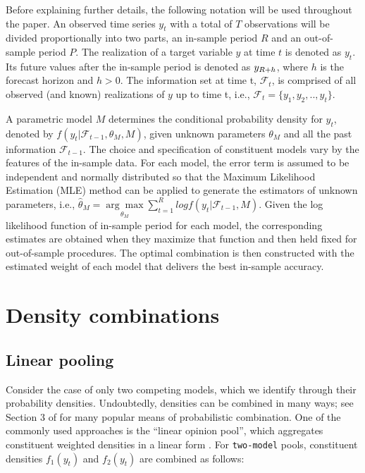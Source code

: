 \documentclass{monashthesis}
\begin{document}
Before explaining further details, the following notation will be used throughout the paper. An observed time series \(y_t\) with a total of \(T\) observations will be divided proportionally into two parts, an in-sample period \(R\) and an out-of-sample period \(P\). The realization of a target variable \(y\) at time \(t\) is denoted as \(y_t\). Its future values after the in-sample period is denoted as \(y_{\small{R+h}}\), where \(h\) is the forecast horizon and \(h>0\). The information set at time t, \(\mathcal{F}_t\), is comprised of all observed (and known) realizations of \(y\) up to time t, i.e., \(\mathcal{F}_t = \{y_1, y_2, .., y_t\}\).

A parametric model \(M\) determines the conditional probability density for \(y_t\), denoted by \(f(y_t|\mathcal{F}_{t-1}, \theta_M, M)\), given unknown parameters \(\theta_M\) and all the past information \(\mathcal{F}_{t-1}\). The choice and specification of constituent models vary by the features of the in-sample data. For each model, the error term is assumed to be independent and normally distributed so that the Maximum Likelihood Estimation (MLE) method can be applied to generate the estimators of unknown parameters, i.e., \(\hat\theta_M = \underset{\theta_M}{\arg\max} \sum^R_{t=1} log f(y_t|\mathcal{F}_{t-1}, M)\). Given the log likelihood function of in-sample period for each model, the corresponding estimates are obtained when they maximize that function and then held fixed for out-of-sample procedures. The optimal combination is then constructed with the estimated weight of each model that delivers the best in-sample accuracy.

\hypertarget{density-combinations}{%
\section{Density combinations}\label{density-combinations}}

\hypertarget{linear-pooling}{%
\subsection{Linear pooling}\label{linear-pooling}}

Consider the case of only two competing models, which we identify through their probability densities. Undoubtedly, densities can be combined in many ways; see Section 3 of \textcite{WHLK22} for many popular means of probabilistic combination. One of the commonly used approaches is the ``linear opinion pool'', which aggregates constituent weighted densities in a linear form \autocites[e.g.,][]{BG69,HM07,GA11}. For \texttt{two-model} pools, constituent densities \(f_1(y_t)\) and \(f_2(y_t)\) are combined as follows:
\end{document}

